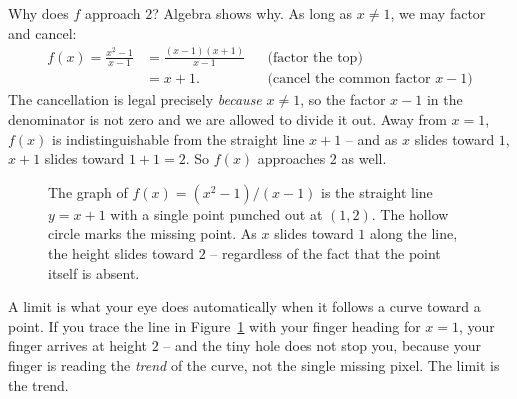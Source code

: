 Why does $f$ approach $2$? Algebra shows why. As long as $x \neq 1$, we may factor and
cancel:
\begin{align*}
  f(x) = \frac{x^2 - 1}{x - 1}
  &= \frac{(x-1)(x+1)}{x - 1} && \text{(factor the top)}\\
  &= x + 1. && \text{(cancel the common factor $x-1$)}
\end{align*}
The cancellation is legal precisely \emph{because} $x \neq 1$, so the factor $x - 1$ in the
denominator is not zero and we are allowed to divide it out. Away from $x = 1$,
$f(x)$ is indistinguishable from the straight line $x + 1$ -- and as $x$ slides toward $1$, $x + 1$ slides toward $1 + 1 = 2$.
So $f(x)$ approaches $2$ as well.

\begin{figure}[htbp]
\centering
{}
\caption{The graph of $f(x)=(x^2-1)/(x-1)$ is the straight line $y=x+1$ with a single
point punched out at $(1,2)$. The hollow circle marks the missing point. As $x$ slides toward
$1$ along the line, the height slides toward $2$ -- regardless of the fact that the point
itself is absent.}
\label{ch05:hole}
\end{figure}

\begin{intuitionbox}
A limit is what your eye does automatically when it follows a curve toward a point. If you trace
the line in Figure~\ref{ch05:hole} with your finger heading for $x=1$, your finger arrives at
height $2$ -- and the tiny hole does not stop you, because your finger is reading the
\emph{trend} of the curve, not the single missing pixel. The limit is the trend.
\end{intuitionbox}

